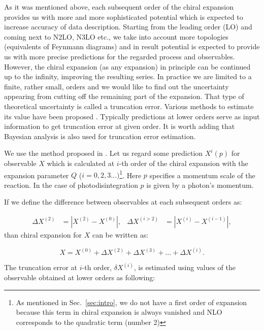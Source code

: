     As it was mentioned above, each subsequent order of the chiral
    expansion provides us with more and more sophisticated
    potential which is expected to increase accuracy of data description.
    Starting from the leading order (LO) and coming next to
    N2LO, N3LO etc., we take into account more topologies (equivalents of Feynmann diagrams) 
    and in result potential is expected to provide us with more precise predictions
    for the regarded process and observables. However, the chiral expansion (as any expansion) 
    in principle can be continued up to the infinity, improving the resulting series.
    In practice we are limited to a finite, rather small, orders 
    and we would like to find out
    the uncertainty appearing from cutting off the remaining part of the expansion.
    That type of theoretical uncertainty is called a truncation error. 
    Various methods to estimate its value
    have been proposed \cite{epelkrebs2015, Epelbaum2015_trunc, Binder2015, Epelbaum_pos, Miller_arxiv}.
    Typically predictions at lower orders serve as input information to get truncation error at given order.
    It is worth adding that Bayesian analysis is also used for truncation error estimation.

    We use the method proposed in \cite{Binder2015}.
    Let us regard some prediction $X^i(p)$ for observable $X$ which is calculated
    at $i$-th order of the chiral expansion 
    with the expansion parameter $Q$ ($i = 0,2,3...)$\footnote{As mentioned in Sec.~\ref{sec:intro}, we do not have a first order of expansion
    because this term in chiral expansion is always vanished
    and NLO  corresponds to the quadratic term (number 2)}.
    Here $p$ specifies a momentum
    scale of the reaction. In the case of photodisintegration $p$ is given by a
    photon's momentum.  

    If we define the difference between observables at each subsequent orders as:

    \begin{align}
        \Delta X^{(2)} &= |X^{(2)} - X^{(0)}|,& \Delta X^{(i>2)} &= |X^{(i)} - X^{(i-1)}|,
    \end{align}
    than chiral expansion for $X$ can be written as:

    \begin{equation}
        X = X^{(0)} + \Delta X^{(2)} + \Delta X^{(3)} + ... + \Delta X^{(i)}.
        \label{trunc1}
    \end{equation}
        
    The truncation error at $i$-th order, $\delta X^{(i)}$, is estimated using
     values of the observable obtained at lower 
    orders as following:

